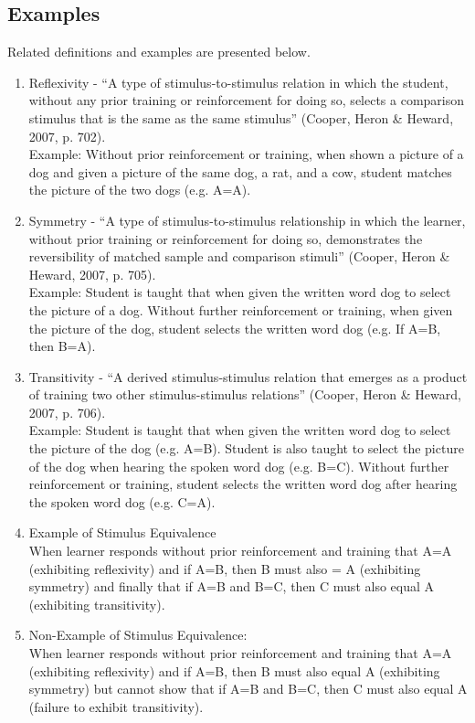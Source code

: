 \subsection{Examples}
Related definitions and examples are presented below.
\begin{enumerate}
\item Reflexivity - ``A type of stimulus-to-stimulus relation in which the student, without any prior training or reinforcement for doing so, selects a comparison stimulus that is the same as the same stimulus'' (Cooper, Heron \& Heward, 2007, p. 702).\\
 Example: Without prior reinforcement or training, when shown a picture of a dog and given a picture of the same dog, a rat, and a cow, student matches the picture of the two dogs (e.g. A=A).
\item Symmetry - ``A type of stimulus-to-stimulus relationship in which the learner, without prior training or reinforcement for doing so, demonstrates the reversibility of matched sample and comparison stimuli'' (Cooper, Heron \& Heward, 2007, p. 705).\\
 Example: Student is taught that when given the written word dog to select the picture of a dog. Without further reinforcement or training, when given the picture of the dog, student selects the written word dog (e.g. If A=B, then B=A). 
\item Transitivity - ``A derived stimulus-stimulus relation that emerges as a product of training two other stimulus-stimulus relations'' (Cooper, Heron \& Heward, 2007, p. 706).\\
 Example: Student is taught that when given the written word dog to select the picture of the dog (e.g. A=B). Student is also taught to select the picture of the dog when hearing the spoken word dog (e.g. B=C). Without further reinforcement or training, student selects the written word dog after hearing the spoken word dog (e.g. C=A). 

\item Example of Stimulus Equivalence\\
When learner responds without prior reinforcement and training that A=A (exhibiting reflexivity) and if A=B, then B must also = A (exhibiting symmetry) and finally that if A=B and B=C, then C must also equal A (exhibiting transitivity). 

\item Non-Example of Stimulus Equivalence:\\
 When learner responds without prior reinforcement and training that A=A (exhibiting reflexivity) and if A=B, then B must also equal A (exhibiting symmetry) but cannot show that if A=B and B=C, then C must also equal A (failure to exhibit transitivity). 
%
\end{enumerate}
%

